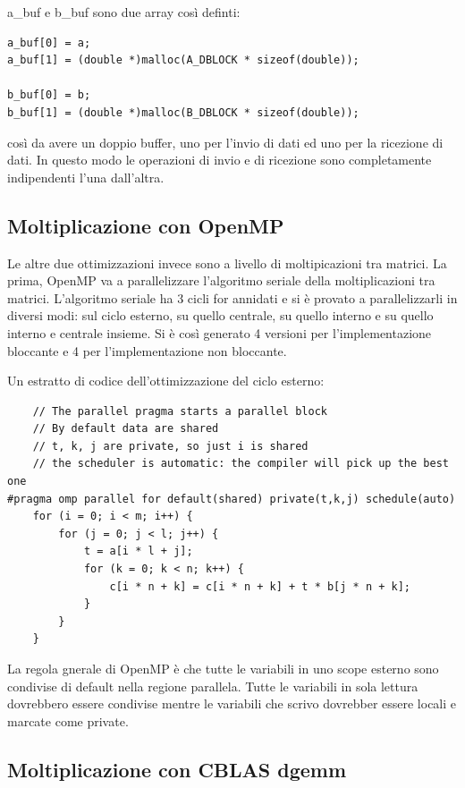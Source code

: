a\_buf e b\_buf sono due array cos\`{i} definti:

\begin{lstlisting}
a_buf[0] = a;
a_buf[1] = (double *)malloc(A_DBLOCK * sizeof(double));

b_buf[0] = b;
b_buf[1] = (double *)malloc(B_DBLOCK * sizeof(double));
\end{lstlisting}

cos\`{i} da avere un doppio buffer, uno per l'invio di dati ed uno per la ricezione di dati. In questo modo le operazioni di invio e di ricezione sono completamente indipendenti l'una dall'altra.

\subsection{Moltiplicazione con OpenMP}

Le altre due ottimizzazioni invece sono a livello di moltipicazioni tra matrici. La prima, OpenMP va a parallelizzare l'algoritmo seriale della moltiplicazioni tra matrici. L'algoritmo seriale ha 3 cicli for annidati e si \`{e} provato a parallelizzarli in diversi modi: sul ciclo esterno, su quello centrale, su quello interno e su quello interno e centrale insieme. Si \`{e} cos\`{i} generato 4 versioni per l'implementazione bloccante e 4 per l'implementazione non bloccante.

Un estratto di codice dell'ottimizzazione del ciclo esterno:

\begin{lstlisting}
    // The parallel pragma starts a parallel block
    // By default data are shared
    // t, k, j are private, so just i is shared
    // the scheduler is automatic: the compiler will pick up the best one
#pragma omp parallel for default(shared) private(t,k,j) schedule(auto)
    for (i = 0; i < m; i++) {
        for (j = 0; j < l; j++) {
            t = a[i * l + j];
            for (k = 0; k < n; k++) {
                c[i * n + k] = c[i * n + k] + t * b[j * n + k];
            }
        }
    }
\end{lstlisting}

La regola gnerale di OpenMP \`{e} che tutte le variabili in uno scope esterno sono condivise di default nella regione parallela. Tutte le variabili in sola lettura dovrebbero essere condivise mentre le variabili che scrivo dovrebber essere locali e marcate come private.

\subsection{Moltiplicazione con CBLAS dgemm}

